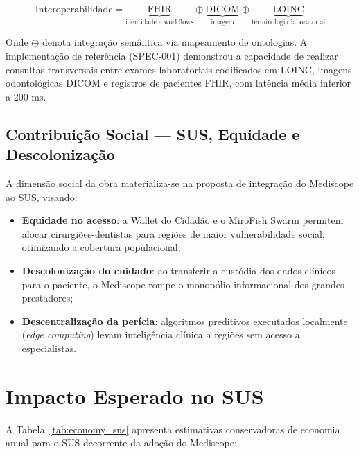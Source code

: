 \begin{equation}
\text{Interoperabilidade} = \underbrace{\text{FHIR}}_{\text{identidade e workflows}} \oplus \underbrace{\text{DICOM}}_{\text{imagem}} \oplus \underbrace{\text{LOINC}}_{\text{terminologia laboratorial}}
\label{eq:interop_triad}
\end{equation}

Onde $\oplus$ denota integração semântica via mapeamento de ontologias. A implementação de referência (SPEC-001) demonstrou a capacidade de realizar consultas transversais entre exames laboratoriais codificados em LOINC, imagens odontológicas DICOM e registros de pacientes FHIR, com latência média inferior a 200 ms.

\subsection{Contribuição Social --- SUS, Equidade e Descolonização}

A dimensão social da obra materializa-se na proposta de integração do Mediscope ao SUS, visando:
\begin{itemize}
    \item \textbf{Equidade no acesso}: a Wallet do Cidadão e o MiroFish Swarm permitem alocar cirurgiões-dentistas para regiões de maior vulnerabilidade social, otimizando a cobertura populacional;
    \item \textbf{Descolonização do cuidado}: ao transferir a custódia dos dados clínicos para o paciente, o Mediscope rompe o monopólio informacional dos grandes prestadores;
    \item \textbf{Descentralização da perícia}: algoritmos preditivos executados localmente (\textit{edge computing}) levam inteligência clínica a regiões sem acesso a especialistas.
\end{itemize}

\section{Impacto Esperado no SUS}

A Tabela~\ref{tab:economy_sus} apresenta estimativas conservadoras de economia anual para o SUS decorrente da adoção do Mediscope:

